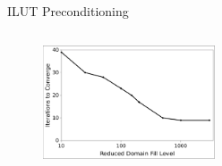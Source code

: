 \documentclass{beamer}
\begin{document}
\begin{frame}{ILUT Preconditioning}
\begin{columns}
\begin{column}{0.5\textwidth}
      \begin{figure}[t!]
        \begin{center}
          \includegraphics[width=2.0in]{rda_ilut_iterations.pdf}
        \end{center}
      \end{figure}

    \end{column}


  \end{columns}

\end{frame}
\end{document}

